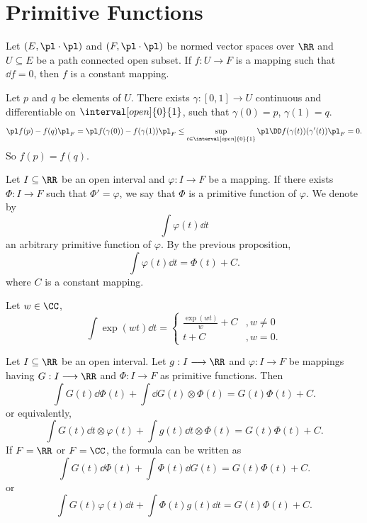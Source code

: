 \section{Primitive Functions}
\begin{propositionenv}
    Let $(E,\pl\cdot\pl)$ and $(F,\pl\cdot\pl)$ be normed vector spaces over $\RR$ and $U\subseteq E$ be a path connected open subset.
    If $f: U\longrightarrow F$ is a mapping such that $\dd f=0$, then $f$ is a constant mapping.
\end{propositionenv}
\begin{proofenv}
    Let $p$ and $q$ be elements of $U$. There exists $\gamma:[0,1]\longrightarrow U$ continuous and differentiable on $\interval[open]{0}{1}$, such that $\gamma(0)=p$, $\gamma(1)=q$.
    $$ \pl f(p)-f(q)\pl_F=\pl f(\gamma(0))- f(\gamma(1))\pl_F\le \sup_{t\in \interval[open]{0}{1}}\pl \DD f(\gamma(t))(\gamma'(t))\pl_F=0.$$
    So $f(p)=f(q)$.
\end{proofenv}
\begin{definitionenv}
    Let $I\subseteq \RR$ be an open interval and $\varphi: I\longrightarrow F$ be a mapping. If there exists $\varPhi: I\longrightarrow F$ such that $\varPhi'=\varphi$, we say that $\varPhi$ is a primitive function of $\varphi$. We denote by 
    $$ \int\varphi(t)\dd t$$
    an arbitrary primitive function of $\varphi$.
    By the previous proposition,
    $$ \int\varphi(t)\dd t=\varPhi(t)+C.$$
    where $C$ is a constant mapping.
\end{definitionenv}
\begin{exampleenv}
    Let $w\in \CC$,
    $$ \int \exp(wt)\dd t=\left\{\begin{array}{cl}
         \frac{\exp(wt)}{w}+C&,w\neq 0\\
         t+C&,w=0.
    \end{array}\right.$$
\end{exampleenv}
\begin{propositionenv}
    Let $I\subseteq \RR$ be an open interval. Let $g: I\longrightarrow \RR$ and $\varphi:I\longrightarrow F$  be mappings having $G: I\longrightarrow \RR$ and $\varPhi: I\longrightarrow F$ as primitive functions.
    Then
    $$ \int G(t) \dd \varPhi(t)+\int \dd G(t)\otimes \varPhi(t)=G(t)\varPhi(t) + C.$$
    or equivalently,
    $$ \int G(t) \dd t \otimes \varphi (t)+\int g(t)\dd t\otimes \varPhi(t)=G(t)\varPhi(t) + C.$$
    If $F=\RR$ or $F=\CC$, the formula can be written as 
    $$ \int G(t) \dd \varPhi(t)+\int \Phi(t) \dd G(t) =G(t)\varPhi(t) +C.$$
    or 
    $$ \int G(t)  \varphi (t) \dd t +\int  \varPhi(t) g(t) \dd t =G(t)\varPhi(t) + C.$$

\end{propositionenv}
